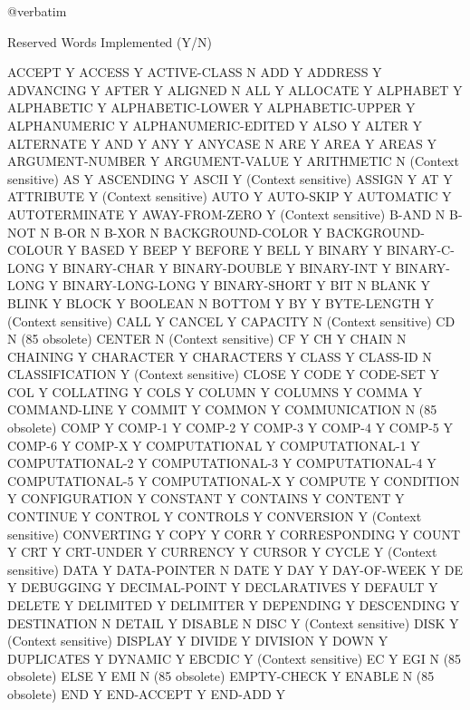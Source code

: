 @verbatim

Reserved Words			Implemented (Y/N)

ACCEPT				Y
ACCESS				Y
ACTIVE-CLASS			N
ADD				Y
ADDRESS				Y
ADVANCING			Y
AFTER				Y
ALIGNED				N
ALL				Y
ALLOCATE			Y
ALPHABET			Y
ALPHABETIC			Y
ALPHABETIC-LOWER		Y
ALPHABETIC-UPPER		Y
ALPHANUMERIC			Y
ALPHANUMERIC-EDITED		Y
ALSO				Y
ALTER				Y
ALTERNATE			Y
AND				Y
ANY				Y
ANYCASE				N
ARE				Y
AREA				Y
AREAS				Y
ARGUMENT-NUMBER			Y
ARGUMENT-VALUE			Y
ARITHMETIC			N (Context sensitive)
AS				Y
ASCENDING			Y
ASCII				Y (Context sensitive)
ASSIGN				Y
AT				Y
ATTRIBUTE			Y (Context sensitive)
AUTO				Y
AUTO-SKIP			Y
AUTOMATIC			Y
AUTOTERMINATE			Y
AWAY-FROM-ZERO			Y (Context sensitive)
B-AND				N
B-NOT				N
B-OR				N
B-XOR				N
BACKGROUND-COLOR		Y
BACKGROUND-COLOUR		Y
BASED				Y
BEEP				Y
BEFORE				Y
BELL				Y
BINARY				Y
BINARY-C-LONG			Y
BINARY-CHAR			Y
BINARY-DOUBLE			Y
BINARY-INT			Y
BINARY-LONG			Y
BINARY-LONG-LONG		Y
BINARY-SHORT			Y
BIT				N
BLANK				Y
BLINK				Y
BLOCK				Y
BOOLEAN				N
BOTTOM				Y
BY				Y
BYTE-LENGTH			Y (Context sensitive)
CALL				Y
CANCEL				Y
CAPACITY			N (Context sensitive)
CD				N (85 obsolete)
CENTER				N (Context sensitive)
CF				Y
CH				Y
CHAIN				N
CHAINING			Y
CHARACTER			Y
CHARACTERS			Y
CLASS				Y
CLASS-ID			N
CLASSIFICATION			Y (Context sensitive)
CLOSE				Y
CODE				Y
CODE-SET			Y
COL				Y
COLLATING			Y
COLS				Y
COLUMN				Y
COLUMNS				Y
COMMA				Y
COMMAND-LINE			Y
COMMIT				Y
COMMON				Y
COMMUNICATION			N (85 obsolete)
COMP				Y
COMP-1				Y
COMP-2				Y
COMP-3				Y
COMP-4				Y
COMP-5				Y
COMP-6				Y
COMP-X				Y
COMPUTATIONAL			Y
COMPUTATIONAL-1			Y
COMPUTATIONAL-2			Y
COMPUTATIONAL-3			Y
COMPUTATIONAL-4			Y
COMPUTATIONAL-5			Y
COMPUTATIONAL-X			Y
COMPUTE				Y
CONDITION			Y
CONFIGURATION			Y
CONSTANT			Y
CONTAINS			Y
CONTENT				Y
CONTINUE			Y
CONTROL				Y
CONTROLS			Y
CONVERSION			Y (Context sensitive)
CONVERTING			Y
COPY				Y
CORR				Y
CORRESPONDING			Y
COUNT				Y
CRT				Y
CRT-UNDER			Y
CURRENCY			Y
CURSOR				Y
CYCLE				Y (Context sensitive)
DATA				Y
DATA-POINTER			N
DATE				Y
DAY				Y
DAY-OF-WEEK			Y
DE				Y
DEBUGGING			Y
DECIMAL-POINT			Y
DECLARATIVES			Y
DEFAULT				Y
DELETE				Y
DELIMITED			Y
DELIMITER			Y
DEPENDING			Y
DESCENDING			Y
DESTINATION			N
DETAIL				Y
DISABLE				N
DISC				Y (Context sensitive)
DISK				Y (Context sensitive)
DISPLAY				Y
DIVIDE				Y
DIVISION			Y
DOWN				Y
DUPLICATES			Y
DYNAMIC				Y
EBCDIC				Y (Context sensitive)
EC				Y
EGI				N (85 obsolete)
ELSE				Y
EMI				N (85 obsolete)
EMPTY-CHECK			Y
ENABLE				N (85 obsolete)
END				Y
END-ACCEPT			Y
END-ADD				Y
